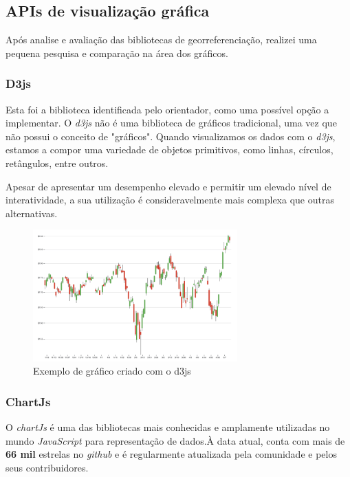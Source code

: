 \subsection{APIs de visualização gráfica} %
Após analise e avaliação das bibliotecas de georreferenciação, realizei uma pequena pesquisa e comparação na área dos gráficos.


\subsubsection{\textbf{D3js}}\label{sec:d3js}
Esta foi a biblioteca identificada pelo orientador, como uma possível opção a implementar. O \textit{d3js} não é uma biblioteca de gráficos tradicional, uma vez que não possui o conceito de "gráficos". Quando visualizamos os dados com o \textit{d3js}, estamos a compor uma variedade de objetos primitivos, como linhas, círculos, retângulos, entre outros. 

Apesar de apresentar um desempenho elevado e permitir um elevado nível de interatividade, a sua utilização é consideravelmente mais complexa que outras alternativas.


\begin{figure}[h!]
    \centering
    \includegraphics[width=0.7\textwidth]{figs/d3js.png}
    \caption[Gráfico d3js]{Exemplo de gráfico criado com o d3js}
    \label{fig:d3js}
\end{figure}

\subsubsection{\textbf{ChartJs}}\label{sec:chartjs}
O \textit{chartJs} é uma das bibliotecas mais conhecidas e amplamente utilizadas no mundo \textit{JavaScript} para representação de dados.À data atual, conta com mais de \textbf{66 mil} estrelas no \textit{github}\cite{chartJs.github.url} e é regularmente atualizada pela comunidade e pelos seus contribuidores.


